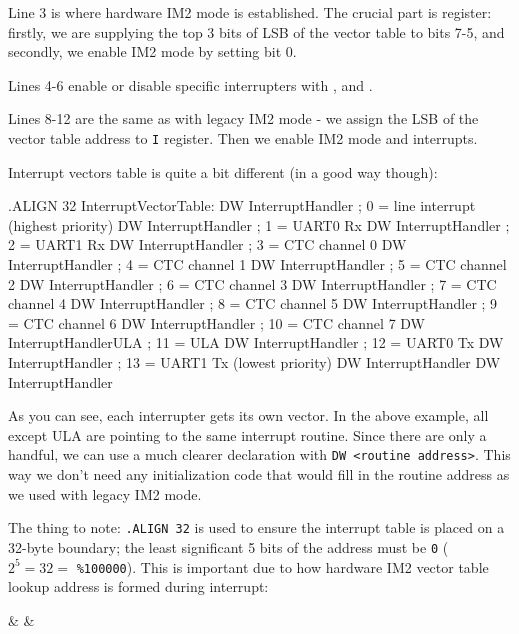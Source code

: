 Line 3 is where hardware IM2 mode is established. The crucial part is  register: firstly, we are supplying the top 3 bits of LSB of the vector table to bits 7-5, and secondly, we enable IM2 mode by setting bit 0.

Lines 4-6 enable or disable specific interrupters with ,  and .

Lines 8-12 are the same as with legacy IM2 mode - we assign the LSB of the vector table address to {\tt I} register. Then we enable IM2 mode and interrupts.

Interrupt vectors table is quite a bit different (in a good way though):

\begin{tcblisting}{}
	.ALIGN 32
InterruptVectorTable:
	DW InterruptHandler        ; 0 = line interrupt (highest priority)
	DW InterruptHandler        ; 1 = UART0 Rx
	DW InterruptHandler        ; 2 = UART1 Rx
	DW InterruptHandler        ; 3 = CTC channel 0
	DW InterruptHandler        ; 4 = CTC channel 1
	DW InterruptHandler        ; 5 = CTC channel 2
	DW InterruptHandler        ; 6 = CTC channel 3
	DW InterruptHandler        ; 7 = CTC channel 4
	DW InterruptHandler        ; 8 = CTC channel 5
	DW InterruptHandler        ; 9 = CTC channel 6
	DW InterruptHandler        ; 10 = CTC channel 7
	DW InterruptHandlerULA     ; 11 = ULA
	DW InterruptHandler        ; 12 = UART0 Tx
	DW InterruptHandler        ; 13 = UART1 Tx (lowest priority)
	DW InterruptHandler
	DW InterruptHandler
\end{tcblisting}

As you can see, each interrupter gets its own vector. In the above example, all except ULA are pointing to the same interrupt routine. Since there are only a handful, we can use a much clearer declaration with {\tt DW <routine address>}. This way we don't need any initialization code that would fill in the routine address as we used with legacy IM2 mode.

The thing to note: {\tt .ALIGN 32} is used to ensure the interrupt table is placed on a 32-byte boundary; the least significant 5 bits of the address must be {\tt 0} ($2^5=32=$ {\tt \%100000}). This is important due to how hardware IM2 vector table lookup address is formed during interrupt:

\begin{BitTableWord}
	 &  &  \\
\end{BitTableWord}


